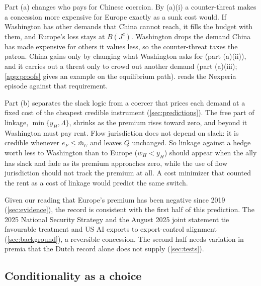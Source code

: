 Part (a) changes who pays for Chinese coercion. By (a)(i) a counter-threat makes a concession more expensive for Europe exactly as a sunk cost would. If Washington has other demands that China cannot reach, it fills the budget with them, and Europe's loss stays at $B(J^c)$. Washington drops the demand China has made expensive for others it values less, so the counter-threat taxes the patron. China gains only by changing what Washington asks for (part (a)(ii)), and it carries out a threat only to crowd out another demand (part (a)(iii); \cref{app:proofs} gives an example on the equilibrium path).  reads the Nexperia episode against that requirement.

Part (b) separates the slack logic from a coercer that prices each demand at a fixed cost of the cheapest credible instrument (\cref{sec:predictions}). The free part of linkage, $\min\{y_H,\Lambda\}$, shrinks as the premium rises toward zero, and beyond it Washington must pay rent. Flow jurisdiction does not depend on slack: it is credible whenever $e_F\le\bar m_U$ and leaves $Q$ unchanged. So linkage against a hedge worth less to Washington than to Europe ($w_H<y_H$) should appear when the ally has slack and fade as its premium approaches zero, while the use of flow jurisdiction should not track the premium at all. A cost minimizer that counted the rent as a cost of linkage would predict the same switch.

Given our reading that Europe's premium has been negative since 2019 (\cref{sec:evidence}), the record is consistent with the first half of this prediction. The 2025 National Security Strategy and the August 2025 joint statement tie favourable treatment and US AI exports to export-control alignment (\cref{sec:background}), a reversible concession. The second half needs variation in premia that the Dutch record alone does not supply (\cref{sec:tests}).

\subsection{Conditionality as a choice}\label{sec:conditionality}

